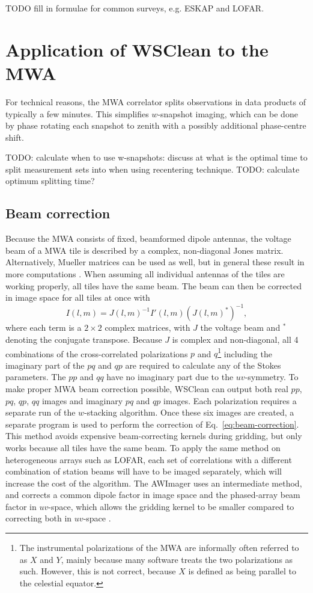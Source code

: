 \documentclass[useAMS,usenatbib]{mn2e}
\begin{document}
TODO fill in formulae for common surveys, e.g. ESKAP and LOFAR.

\section{Application of WSClean to the MWA}
For technical reasons, the MWA correlator splits observations in data products of typically a few minutes. This simplifies $w$-snapshot imaging, which can be done by phase rotating each snapshot to zenith with a possibly additional phase-centre shift. 

TODO: calculate when to use w-snapshots: discuss at what is the optimal time to split measurement sets into when using recentering technique.
TODO: calculate optimum splitting time?

\subsection{Beam correction}
Because the MWA consists of fixed, beamformed dipole antennas, the voltage beam of a MWA tile is described by a complex, non-diagonal Jones matrix. Alternatively, Mueller matrices can be used as well, but in general these result in more computations \citep{revisiting-me-i}. When assuming all individual antennas of the tiles are working properly, all tiles have the same beam. The beam can then be corrected in image space for all tiles at once with
\begin{equation}\label{eq:beam-correction}
 I(l, m) = J(l,m)^{-1} I'(l, m) \left(J(l,m)^*\right)^{-1},
\end{equation}
where each term is a $2\times2$ complex matrices, with $J$ the voltage beam and $^*$ denoting the conjugate transpose. Because $J$ is complex and non-diagonal, all 4 combinations of the cross-correlated polarizations $p$ and $q$\footnote{The instrumental polarizations of the MWA are informally often referred to as $X$ and $Y$, mainly because many software treats the two polarizations as such. However, this is not correct, because $X$ is defined as being parallel to the celestial equator.} including the imaginary part of the $pq$ and $qp$ are required to calculate any of the Stokes parameters. The $pp$ and $qq$ have no imaginary part due to the $uv$-symmetry. To make proper MWA beam correction possible, WSClean can output both real $pp$, $pq$, $qp$, $qq$ images and imaginary $pq$ and $qp$ images. Each polarization requires a separate run of the $w$-stacking algorithm. Once these six images are created, a separate program is used to perform the correction of Eq.~\eqref{eq:beam-correction}. This method avoids expensive beam-correcting kernels during gridding, but only works because all tiles have the same beam. To apply the same method on heterogeneous arrays such as LOFAR, each set of correlations with a different combination of station beams will have to be imaged separately, which will increase the cost of the algorithm. The AWImager uses an intermediate method, and corrects a common dipole factor in image space and the phased-array beam factor in $uv$-space, which allows the gridding kernel to be smaller compared to correcting both in $uv$-space \citep{awimager-2013}.
\end{document}
